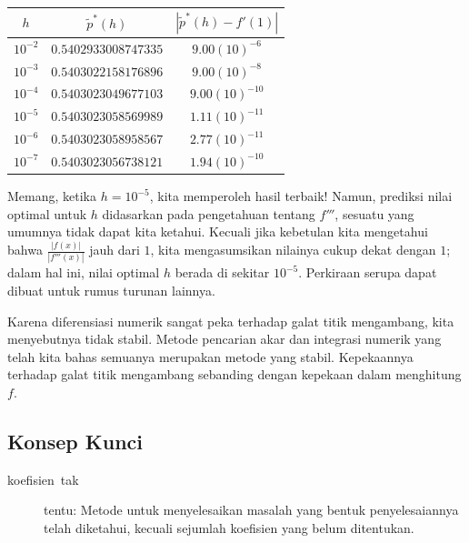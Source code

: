 \begin{center}
\begin{tabular}{c|c|c}
$h$ & $\tilde{p}^{*}(h)$ & $|\tilde{p}^{*}(h)-f'(1)|$\tabularnewline
\hline 
$10^{-2}$ & $0.5402933008747335$ & $9.00(10)^{-6}$\tabularnewline
$10^{-3}$ & $0.5403022158176896$ & $9.00(10)^{-8}$\tabularnewline
$10^{-4}$ & $0.5403023049677103$ & $9.00(10)^{-10}$\tabularnewline
$10^{-5}$ & $0.5403023058569989$ & $1.11(10)^{-11}$\tabularnewline
$10^{-6}$ & $0.5403023058958567$ & $2.77(10)^{-11}$\tabularnewline
$10^{-7}$ & $0.5403023056738121$ & $1.94(10)^{-10}$\tabularnewline
\end{tabular}
\par\end{center}

\noindent Memang, ketika $h=10^{-5}$, kita memperoleh hasil terbaik!
Namun, prediksi nilai optimal untuk $h$ didasarkan pada pengetahuan
tentang $f'''$, sesuatu yang umumnya tidak dapat kita ketahui. Kecuali
jika kebetulan kita mengetahui bahwa $\frac{|f(x)|}{|f'''(x)|}$ jauh
dari $1$, kita mengasumsikan nilainya cukup dekat dengan $1$; dalam
hal ini, nilai optimal $h$ berada di sekitar $10^{-5}$. Perkiraan
serupa dapat dibuat untuk rumus turunan lainnya.

Karena diferensiasi numerik sangat peka terhadap galat titik mengambang,
kita menyebutnya tidak stabil. Metode pencarian akar dan integrasi
numerik yang telah kita bahas semuanya merupakan metode yang stabil.
Kepekaannya terhadap galat titik mengambang sebanding dengan kepekaan
dalam menghitung $f$.

\subsection{Konsep Kunci}
\begin{description}
\item [{koefisien~tak}] tentu: Metode untuk
menyelesaikan masalah yang bentuk penyelesaiannya telah diketahui,
kecuali sejumlah koefisien yang belum ditentukan.
\end{description}
\noindent\startexercises 

